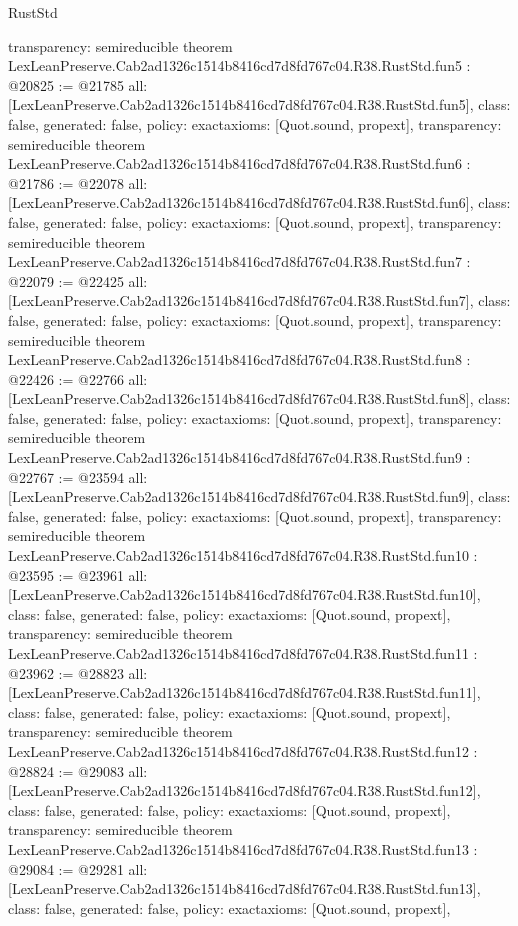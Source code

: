 \begin{lexlean}{RustStd}
\begin{coremodule}
{  transparency: semireducible
}
theorem LexLeanPreserve.Cab2ad1326c1514b8416cd7d8fd767c04.R38.RustStd.fun5 : @20825 := @21785 {
  all: [LexLeanPreserve.Cab2ad1326c1514b8416cd7d8fd767c04.R38.RustStd.fun5],
  class: false,
  generated: false,
  policy: exact{axioms: [Quot.sound, propext]},
  transparency: semireducible
}
theorem LexLeanPreserve.Cab2ad1326c1514b8416cd7d8fd767c04.R38.RustStd.fun6 : @21786 := @22078 {
  all: [LexLeanPreserve.Cab2ad1326c1514b8416cd7d8fd767c04.R38.RustStd.fun6],
  class: false,
  generated: false,
  policy: exact{axioms: [Quot.sound, propext]},
  transparency: semireducible
}
theorem LexLeanPreserve.Cab2ad1326c1514b8416cd7d8fd767c04.R38.RustStd.fun7 : @22079 := @22425 {
  all: [LexLeanPreserve.Cab2ad1326c1514b8416cd7d8fd767c04.R38.RustStd.fun7],
  class: false,
  generated: false,
  policy: exact{axioms: [Quot.sound, propext]},
  transparency: semireducible
}
theorem LexLeanPreserve.Cab2ad1326c1514b8416cd7d8fd767c04.R38.RustStd.fun8 : @22426 := @22766 {
  all: [LexLeanPreserve.Cab2ad1326c1514b8416cd7d8fd767c04.R38.RustStd.fun8],
  class: false,
  generated: false,
  policy: exact{axioms: [Quot.sound, propext]},
  transparency: semireducible
}
theorem LexLeanPreserve.Cab2ad1326c1514b8416cd7d8fd767c04.R38.RustStd.fun9 : @22767 := @23594 {
  all: [LexLeanPreserve.Cab2ad1326c1514b8416cd7d8fd767c04.R38.RustStd.fun9],
  class: false,
  generated: false,
  policy: exact{axioms: [Quot.sound, propext]},
  transparency: semireducible
}
theorem LexLeanPreserve.Cab2ad1326c1514b8416cd7d8fd767c04.R38.RustStd.fun10 : @23595 := @23961 {
  all: [LexLeanPreserve.Cab2ad1326c1514b8416cd7d8fd767c04.R38.RustStd.fun10],
  class: false,
  generated: false,
  policy: exact{axioms: [Quot.sound, propext]},
  transparency: semireducible
}
theorem LexLeanPreserve.Cab2ad1326c1514b8416cd7d8fd767c04.R38.RustStd.fun11 : @23962 := @28823 {
  all: [LexLeanPreserve.Cab2ad1326c1514b8416cd7d8fd767c04.R38.RustStd.fun11],
  class: false,
  generated: false,
  policy: exact{axioms: [Quot.sound, propext]},
  transparency: semireducible
}
theorem LexLeanPreserve.Cab2ad1326c1514b8416cd7d8fd767c04.R38.RustStd.fun12 : @28824 := @29083 {
  all: [LexLeanPreserve.Cab2ad1326c1514b8416cd7d8fd767c04.R38.RustStd.fun12],
  class: false,
  generated: false,
  policy: exact{axioms: [Quot.sound, propext]},
  transparency: semireducible
}
theorem LexLeanPreserve.Cab2ad1326c1514b8416cd7d8fd767c04.R38.RustStd.fun13 : @29084 := @29281 {
  all: [LexLeanPreserve.Cab2ad1326c1514b8416cd7d8fd767c04.R38.RustStd.fun13],
  class: false,
  generated: false,
  policy: exact{axioms: [Quot.sound, propext]},
}
\end{coremodule}
\end{lexlean}
